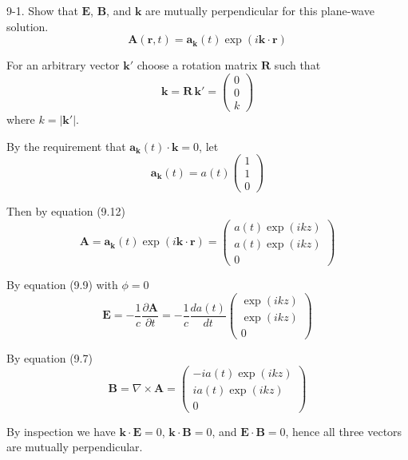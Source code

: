\documentclass[12pt]{article}
\begin{document}
9-1.
Show that $\mathbf E$, $\mathbf B$, and $\mathbf k$ are
mutually perpendicular for this plane-wave solution.
\begin{equation*}
\mathbf A(\mathbf r,t)=\mathbf a_{\mathbf k}(t)
\exp(i\mathbf k\cdot\mathbf r)
\tag{9.12}
\end{equation*}

For an arbitrary vector $\mathbf k'$
choose a rotation matrix $\mathbf R$ such that
\begin{equation*}
\mathbf k=\mathbf R\,\mathbf k'=\begin{pmatrix}0\\0\\k\end{pmatrix}
\end{equation*}
where $k=|\mathbf k'|$.

\bigskip
By the requirement that $\mathbf a_{\mathbf k}(t)\cdot\mathbf k=0$, let
\begin{equation*}
\mathbf a_{\mathbf k}(t)=a(t)\begin{pmatrix}1\\1\\0\end{pmatrix}
\end{equation*}

Then by equation (9.12)
\begin{equation*}
\mathbf A=\mathbf a_{\mathbf k}(t)\exp(i\mathbf k\cdot\mathbf r)
=\begin{pmatrix}
a(t)\exp(ikz)
\\[1ex]
a(t)\exp(ikz)
\\[1ex]
0
\end{pmatrix}
\end{equation*}

By equation (9.9) with $\phi=0$
\begin{equation*}
\mathbf E=-\frac{1}{c}\frac{\partial\mathbf A}{\partial t}=
-\frac{1}{c}\frac{da(t)}{dt}
\begin{pmatrix}
\exp(ikz)
\\[1ex]
\exp(ikz)
\\[1ex]
0
\end{pmatrix}
\end{equation*}

By equation (9.7)
\begin{equation*}
\mathbf B=\nabla\times\mathbf A=
\begin{pmatrix}
-ia(t)\exp(ikz)
\\[1ex]
ia(t)\exp(ikz)
\\[1ex]
0
\end{pmatrix}
\end{equation*}

By inspection we have $\mathbf k\cdot\mathbf E=0$, $\mathbf k\cdot\mathbf B=0$,
and $\mathbf E\cdot\mathbf B=0$, hence all three vectors are mutually perpendicular.
\end{document}
